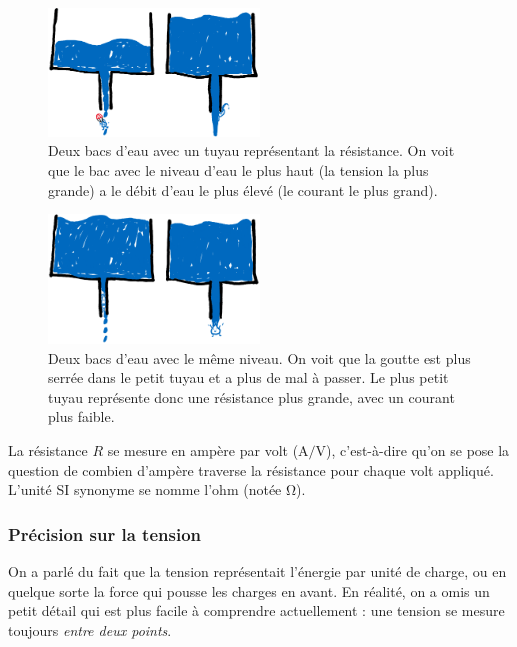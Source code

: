 \documentclass{article}
\begin{document}
\begin{figure}[h]
    \centering
    \includegraphics[width=0.5\textwidth]{Images/Résistance eau.png}
    \caption{Deux bacs d'eau avec un tuyau représentant la résistance. On voit que le bac avec le niveau d'eau le plus haut (la tension la plus grande) a le débit d'eau le plus élevé (le courant le plus grand).}
    \label{fig:résistance_réservoirs}
\end{figure}

\begin{figure}[h]
    \centering
    \includegraphics[width=0.5\textwidth]{Images/Résistance eau - bis.png}
    \caption{Deux bacs d'eau avec le même niveau. On voit que la goutte est plus serrée dans le petit tuyau et a plus de mal à passer. Le plus petit tuyau représente donc une résistance plus grande, avec un courant plus faible.}
    \label{fig:résistance_réservoirs_bis}
\end{figure}

La résistance $R$ se mesure en ampère par volt ($\si{\ampere\per\volt}$), c'est-à-dire qu'on se pose la question de combien d'ampère traverse la résistance pour chaque volt appliqué. L'unité SI synonyme se nomme l'ohm (notée $\si{\ohm}$).

\subsubsection{Précision sur la tension}

On a parlé du fait que la tension représentait l'énergie par unité de charge, ou en quelque sorte la force qui pousse les charges en avant. En réalité, on a omis un petit détail qui est plus facile à comprendre actuellement : une tension se mesure toujours \emph{entre deux points}.
\end{document}
